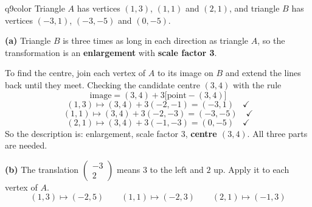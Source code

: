 \documentclass[11pt,a4paper]{article}
\begin{document}
\begin{ansbox}{q9color}
Triangle $A$ has vertices $(1, 3)$, $(1, 1)$ and $(2, 1)$, and triangle $B$ has vertices $(-3, 1)$, $(-3, -5)$ and $(0, -5)$.

\textbf{(a)} Triangle $B$ is three times as long in each direction as triangle $A$, so the transformation is an \textbf{enlargement} with \textbf{scale factor 3}.

To find the centre, join each vertex of $A$ to its image on $B$ and extend the lines back until they meet. Checking the candidate centre $(3, 4)$ with the rule
\[ \text{image} = (3, 4) + 3\big[\text{point} - (3, 4)\big] \]
\[ (1, 3) \mapsto (3, 4) + 3(-2, -1) = (-3, 1) \quad \checkmark \]
\[ (1, 1) \mapsto (3, 4) + 3(-2, -3) = (-3, -5) \quad \checkmark \]
\[ (2, 1) \mapsto (3, 4) + 3(-1, -3) = (0, -5) \quad \checkmark \]
So the description is: enlargement, scale factor $3$, \textbf{centre $(3, 4)$}. All three parts are needed.

\textbf{(b)} The translation $\begin{pmatrix} -3 \\ 2 \end{pmatrix}$ means $3$ to the left and $2$ up. Apply it to each vertex of $A$.
\[ (1, 3) \mapsto (-2, 5) \qquad (1, 1) \mapsto (-2, 3) \qquad (2, 1) \mapsto (-1, 3) \]

\begin{center}
\end{center}
\end{ansbox}
\end{document}
